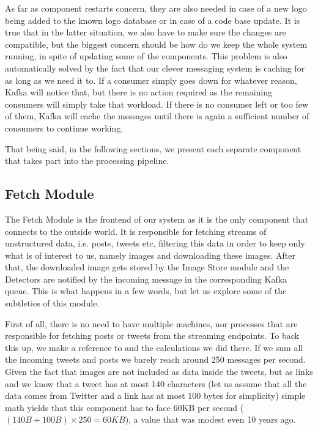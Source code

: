 As far as component restarts concern, they are also needed in case of a new
logo being added to the known logo database or in case of a code base update.
It is true that in the latter situation, we also have to make sure the changes
are compatible, but the biggest concern should be how do we keep the whole
system running, in spite of updating some of the components. This problem is
also automatically solved by the fact that our clever messaging system is
caching for as long as we need it to. If a consumer simply goes down for
whatever reason, Kafka will notice that, but there is no action required as
the remaining consumers will simply take that workload. If there is no
consumer left or too few of them, Kafka will cache the messages until there
is again a sufficient number of consumers to continue working.

That being said, in the following sections, we present each separate component that takes part
into the processing pipeline.

\subsection{Fetch Module}
\label{sub-sec:fetch-module}

The Fetch Module is the frontend of our system as it is the only component
that connects to the outside world. It is responsible for fetching streams of
unstructured data, i.e. posts, tweets etc, filtering this data in order to
keep only what is of interest to us, namely images and downloading these
images. After that, the downloaded image gets stored by the Image Store module
and the Detectors are notified by the incoming message in the corresponding
Kafka queue. This is what happens in a few words, but let us explore some
of the subtleties of this module.

First of all, there is no need to have multiple machines, nor processes that
are responsible for fetching posts or tweets from the streaming endpoints. To
back this up, we make a reference to
 and the calculations we did
there. If we sum all the incoming tweets and posts we barely reach around 250
messages per second. Given the fact that images are not included as data
inside the tweets, but as links and we know that a tweet has at most 140
characters (let us assume that all the data comes from Twitter and a link has
at most 100 bytes for simplicity) simple math yields that this component has
to face 60KB per second (\((140B + 100B) \times 250 = 60KB\)), a value that
was modest even 10 years ago.


